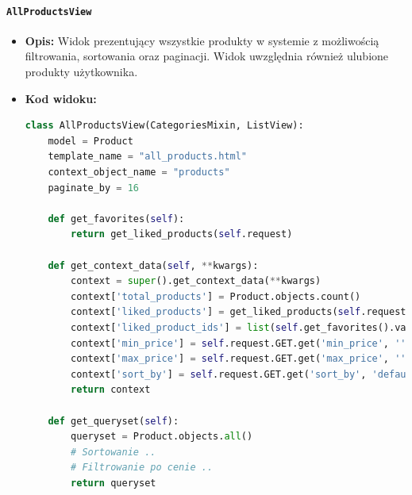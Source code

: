 \documentclass[12pt,a4paper,oneside]{article}
\theoremstyle{definition}
\numberwithin{equation}{section}
\begin{document}
\paragraph{\texttt{AllProductsView}}
    \begin{itemize}
        \item \textbf{Opis:} Widok prezentujący wszystkie produkty w systemie z możliwością filtrowania, sortowania oraz paginacji. Widok uwzględnia również ulubione produkty użytkownika.
        \item \textbf{Kod widoku:}
    \begin{lstlisting}[language=Python, caption=Kod widoku AllProductsView]
class AllProductsView(CategoriesMixin, ListView):
    model = Product
    template_name = "all_products.html"
    context_object_name = "products"
    paginate_by = 16

    def get_favorites(self):
        return get_liked_products(self.request)

    def get_context_data(self, **kwargs):
        context = super().get_context_data(**kwargs)
        context['total_products'] = Product.objects.count()
        context['liked_products'] = get_liked_products(self.request)
        context['liked_product_ids'] = list(self.get_favorites().values_list('id', flat=True))
        context['min_price'] = self.request.GET.get('min_price', '')
        context['max_price'] = self.request.GET.get('max_price', '')
        context['sort_by'] = self.request.GET.get('sort_by', 'default')
        return context

    def get_queryset(self):
        queryset = Product.objects.all()
        # Sortowanie ..
        # Filtrowanie po cenie ..
        return queryset
    \end{lstlisting}


\end{itemize}
\end{document}
